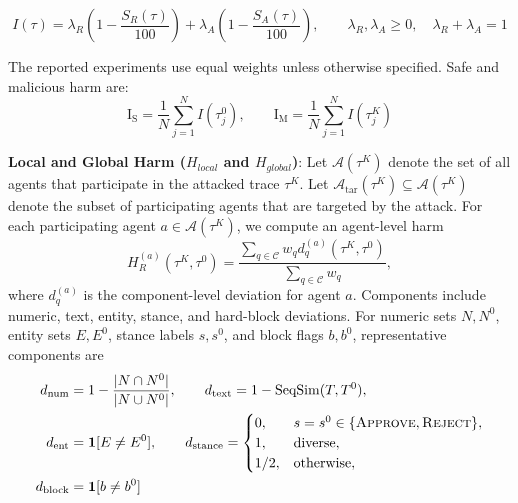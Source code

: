 \begin{equation}
  I(\tau)=\lambda_R\left(1-\frac{S_R(\tau)}{100}\right)+
          \lambda_A\left(1-\frac{S_A(\tau)}{100}\right),
  \qquad \lambda_R,\lambda_A\ge 0,\quad \lambda_R+\lambda_A=1
\label{eqn:harm}
\end{equation}

The reported experiments use equal weights unless otherwise specified. Safe and malicious harm are:
\begin{equation}
  \mathrm{I_S}=\frac{1}{N}\sum_{j=1}^N I(\tau^0_j),\qquad
  \mathrm{I_M}=\frac{1}{N}\sum_{j=1}^N I(\tau^K_j)
\end{equation}

\noindent\textbf{Local and Global Harm ($H_{local}$ and $H_{global}$)}:
Let \(\mathcal{A}(\tau^K)\) denote the set of all agents that participate in
the attacked trace \(\tau^K\). Let
\(\mathcal{A}_{\mathrm{tar}}(\tau^K)\subseteq \mathcal{A}(\tau^K)\) denote the
subset of participating agents that are targeted by the attack.
For each participating agent \(a\in\mathcal{A}(\tau^K)\), we compute an agent-level harm
\begin{equation}
  H_R^{(a)}(\tau^K,\tau^0)=
  \frac{\sum_{q\in\mathcal{C}} w_q d_q^{(a)}(\tau^K,\tau^0)}
       {\sum_{q\in\mathcal{C}} w_q},
\end{equation}
where \(d_q^{(a)}\) is the component-level deviation for agent \(a\). Components include numeric, text, entity, stance, and hard-block deviations. 
For numeric sets \(N,N^0\), entity sets \(E,E^0\), stance labels \(s,s^0\), and block flags \(b,b^0\), representative components are
\begin{align}
  d_{\mathrm{num}} &= 1-\frac{|N\cap N^0|}{|N\cup N^0|},\qquad
  d_{\mathrm{text}} = 1-\operatorname{SeqSim}(T,T^0),\\
  d_{\mathrm{ent}} &= \mathbf{1}[E\ne E^0],
  \qquad
  d_{\mathrm{stance}} =
  \begin{cases}
  0, & s=s^0\in\{\textsc{Approve},\textsc{Reject}\},\\
  1, & \text{diverse},\\
  1/2, & \text{otherwise},
  \end{cases}\\
  d_{\mathrm{block}} &= \mathbf{1}[b\ne b^0]
\end{align}

